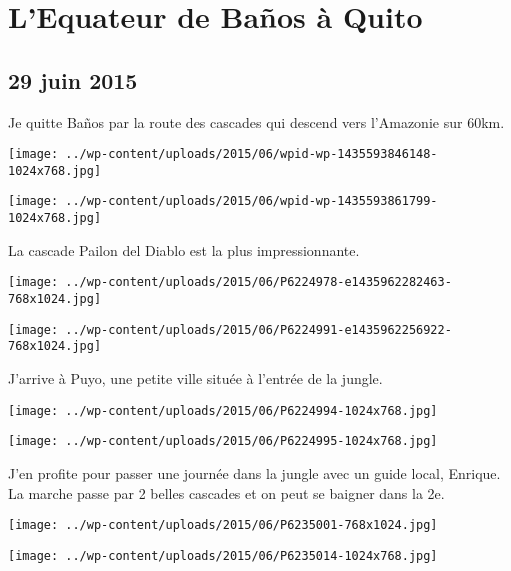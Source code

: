 \chapter{L’Equateur de Baños à Quito}
\section*{29 juin 2015}
Je quitte Baños par la route des cascades qui descend vers l'Amazonie sur 60km. \newline
 \newline
\centerline{\texttt{[image: ../wp-content/uploads/2015/06/wpid-wp-1435593846148-1024x768.jpg]} } 
 \newline
 \newline
\centerline{\texttt{[image: ../wp-content/uploads/2015/06/wpid-wp-1435593861799-1024x768.jpg]} } 
 \newline
 La cascade Pailon del Diablo est la plus impressionnante. \newline
 \newline
\centerline{\texttt{[image: ../wp-content/uploads/2015/06/P6224978-e1435962282463-768x1024.jpg]} } 
 \newline
 \newline
\centerline{\texttt{[image: ../wp-content/uploads/2015/06/P6224991-e1435962256922-768x1024.jpg]} } 
 \newline
 J'arrive à Puyo, une petite ville située à l'entrée de la jungle. \newline
 \newline
\centerline{\texttt{[image: ../wp-content/uploads/2015/06/P6224994-1024x768.jpg]} } 
 \newline
 \newline
\centerline{\texttt{[image: ../wp-content/uploads/2015/06/P6224995-1024x768.jpg]} } 
 \newline
 J'en profite pour passer une journée dans la jungle avec un guide local, Enrique. \newline
 La marche passe par 2 belles cascades et on peut se baigner dans la 2e. \newline
 \newline
\centerline{\texttt{[image: ../wp-content/uploads/2015/06/P6235001-768x1024.jpg]} } 
 \newline
 \newline
\centerline{\texttt{[image: ../wp-content/uploads/2015/06/P6235014-1024x768.jpg]} } 
